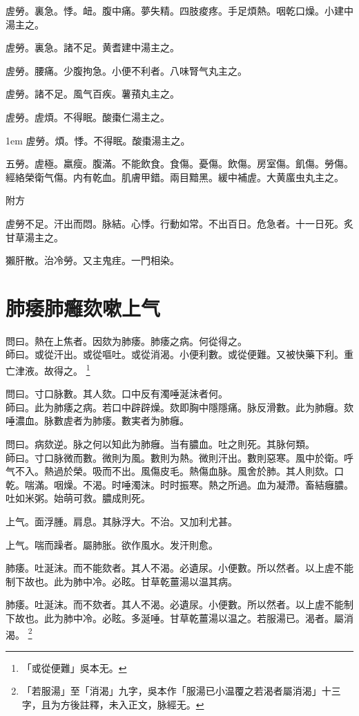 虗勞。裏急。悸。衄。腹中痛。夢失精。四肢痠疼。手足煩熱。咽乾口燥。小建中湯主之。

虗勞。裏急。諸不足。黄耆建中湯主之。

虗勞。腰痛。少腹拘急。小便不利者。八味腎气丸主之。

虗勞。諸不足。風气百疾。薯蕷丸主之。

虗勞。虗煩。不得眠。酸棗{\khaaitp 仁}湯主之。

\hangindent 1em
虗勞。煩。悸。不得眠。酸棗湯主之。{\qianjin}

五勞。虗極。羸瘦。腹滿。不能飲食。食傷。憂傷。飲傷。房室傷。飢傷。勞傷。經絡榮衛气傷。内有乾血。肌膚甲錯。兩目黯黑。緩中補虗。大黄䗪虫丸主之。

附方

虗勞不足。汗出而悶。脉結。心悸。行動如常。不出百日。危急者。十一日死。炙甘草湯主之。

獺肝散。治冷勞。又主鬼疰。一門相染。

\chapter{肺痿肺癰欬嗽上气}

問曰。熱在上焦者。因欬为肺痿。肺痿之病。何從得之。\\
師曰。或從汗出。或從嘔吐。或從消渴。小便利數。{\khaaitp 或從便難。}又被快藥下利。重亡津液。故得之。
	\footnote{
		「或從便難」吳本无。
	}

問曰。寸口脉數。其人欬。口中反有濁唾涎沫者何。\\
師曰。{\khaaitp 此}为肺痿之病。若口中辟辟燥。欬即胸中隱隱痛。脉反滑數。此为肺癰。欬唾濃血。脉數虗者为肺痿。數実者为肺癰。

問曰。病欬逆。脉之何以知此为肺癰。当有膿血。吐之則死。其脉何類。\\
師曰。寸口脉微而數。微則为風。數則为熱。微則汗出。數則惡寒。風中於衛。呼气不入。熱過於榮。吸而不出。風傷皮毛。熱傷血脉。風舍於肺。其人則欬。口乾。喘滿。咽燥。不渴。时唾濁沫。时时振寒。熱之所過。血为凝滯。畜結癰膿。吐如米粥。始萌可救。膿成則死。

上气。面浮腫。肩息。其脉浮大。不治。又加利尤甚。

上气。喘而躁者。屬肺胀。欲作風水。发汗則愈。

肺痿。吐涎沫。而不能欬者。其人不渴。必遺尿。小便數。所以然者。以上虗不能制下故也。此为肺中冷。必眩。甘草乾薑湯以温其病。{\wuben}

肺痿。吐涎沫。而不欬者。其人不渴。必遺尿。小便數。所以然者。以上虗不能制下故也。此为肺中冷。必眩。多涎唾。甘草乾薑湯以温之。若服湯已。渴者。屬消渴。{\dengben}
	\footnote{
		「若服湯」至「消渴」九字，吳本作「服湯已小温覆之若渴者屬消渴」十三字，且为方後註釋，未入正文，脉經无。
		}

